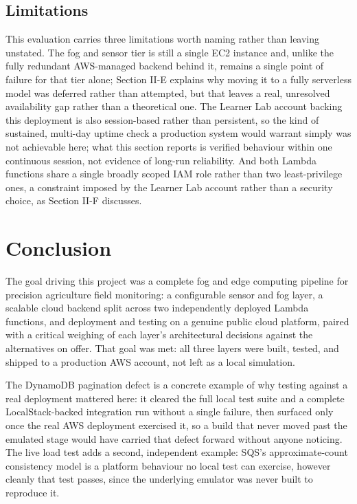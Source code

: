 \documentclass[conference]{IEEEtran}
\begin{document}
\subsection{Limitations}
This evaluation carries three limitations worth naming rather than leaving unstated. The fog and sensor tier is still a single EC2 instance and, unlike the fully redundant AWS-managed backend behind it, remains a single point of failure for that tier alone; Section II-E explains why moving it to a fully serverless model was deferred rather than attempted, but that leaves a real, unresolved availability gap rather than a theoretical one. The Learner Lab account backing this deployment is also session-based rather than persistent, so the kind of sustained, multi-day uptime check a production system would warrant simply was not achievable here; what this section reports is verified behaviour within one continuous session, not evidence of long-run reliability. And both Lambda functions share a single broadly scoped IAM role rather than two least-privilege ones, a constraint imposed by the Learner Lab account rather than a security choice, as Section II-F discusses.

\section{Conclusion}
The goal driving this project was a complete fog and edge computing pipeline for precision agriculture field monitoring: a configurable sensor and fog layer, a scalable cloud backend split across two independently deployed Lambda functions, and deployment and testing on a genuine public cloud platform, paired with a critical weighing of each layer's architectural decisions against the alternatives on offer. That goal was met: all three layers were built, tested, and shipped to a production AWS account, not left as a local simulation.

The DynamoDB pagination defect is a concrete example of why testing against a real deployment mattered here: it cleared the full local test suite and a complete LocalStack-backed integration run without a single failure, then surfaced only once the real AWS deployment exercised it, so a build that never moved past the emulated stage would have carried that defect forward without anyone noticing. The live load test adds a second, independent example: SQS's approximate-count consistency model is a platform behaviour no local test can exercise, however cleanly that test passes, since the underlying emulator was never built to reproduce it.
\end{document}

